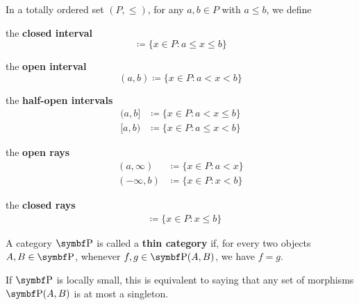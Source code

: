 \begin{definition}\label{def:total_order_interval}\cite{nLab:order_topology}
  In a totally ordered set \( (P, \leq) \), for any \( a, b \in P \) with \( a \leq b \), we define
  \begin{defenum}
     the \textbf{closed interval}
    \begin{equation*}
      [a, b] \coloneqq \{ x \in P \colon a \leq x \leq b \}
    \end{equation*}

     the \textbf{open interval}
    \begin{equation*}
      (a, b) \coloneqq \{ x \in P \colon a < x < b \}
    \end{equation*}

     the \textbf{half-open intervals}
    \begin{align*}
      (a, b] &\coloneqq \{ x \in P \colon a < x \leq b \}
      \\
      [a, b) &\coloneqq \{ x \in P \colon a \leq x < b \}
    \end{align*}

     the \textbf{open rays}
    \begin{align*}
      (a, \infty) &\coloneqq \{ x \in P \colon a < x \}
      \\
      (-\infty, b) &\coloneqq \{ x \in P \colon x < b \}
    \end{align*}

     the \textbf{closed rays}
    \begin{align*}
      [a, \infty) &\coloneqq \{ x \in P \colon a \leq x \}
      \\
      (-\infty, b] &\coloneqq \{ x \in P \colon x \leq b \}
    \end{align*}
  \end{defenum}
\end{definition}

\begin{definition}\label{def:thin_category}\cite{nLab:thin_category}
  A category \( \Bold{P} \) is called a \textbf{thin category} if, for every two objects \( A, B \in \Bold{P} \), whenever \( f, g \in \Bold{P}(A, B) \), we have \( f = g \).

  If \( \Bold{P} \) is locally small, this is equivalent to saying that any set of morphisms \( \Bold{P}(A, B) \) is at most a singleton.
\end{definition}

